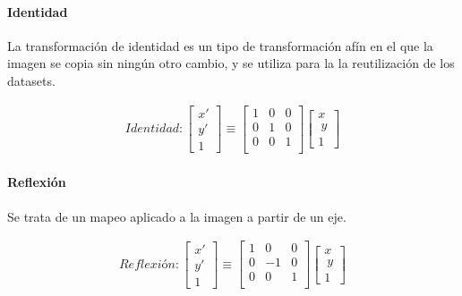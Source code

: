 \paragraph{Identidad}

La transformación de identidad es un tipo de transformación afín en el que la imagen se copia sin ningún otro cambio, y se utiliza para la  
la reutilización de los datasets.


\begin{gather}
	Identidad:
	\begin{bmatrix} x' \\ y' \\ 1 \end{bmatrix}
	\equiv
	 \begin{bmatrix}
	  1 & 0 & 0 \\
	  0 & 1 & 0 \\
	  0 & 0 & 1 \\
	  \end{bmatrix}
	  \begin{bmatrix} x \\\ y \\ 1 \end{bmatrix}
\end{gather}


\paragraph{Reflexión}

Se trata de un mapeo aplicado a la imagen a partir de un eje.


\begin{gather}
	Reflexión:
	\begin{bmatrix} x' \\ y' \\ 1 \end{bmatrix}
	\equiv
	 \begin{bmatrix}
	  1 & 0 & 0 \\
	  0 & -1 & 0 \\
	  0 & 0 & 1 \\
	  \end{bmatrix}
	  \begin{bmatrix} x \\\ y \\ 1 \end{bmatrix}
\end{gather}

